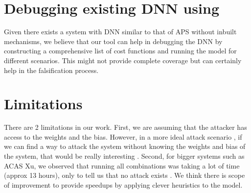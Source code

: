\section{Debugging existing DNN using \tool}
Given there exists a system with DNN similar to that of APS without inbuilt mechanisms, we believe that our tool can help in debugging the DNN by constructing a comprehensive list of cost functions and running the model for different scenarios. This might not provide complete coverage but can certainly help in the falsification process. 

\section{ Limitations}

There are 2 limitations in our work.
First, we are assuming that the attacker has access to the weights and the bias. However, in a more ideal attack scenario , if we  can find a way to  attack the system without knowing the weights and bias of the system, that would be really interesting . %
Second, for bigger systems such as ACAS Xu, we observed that running all combinations was taking a lot of time (approx 13 hours), only to tell us that no attack exists . We think there is scope of improvement to provide speedups by applying clever heuristics to the model. 


\label{section:limitations}